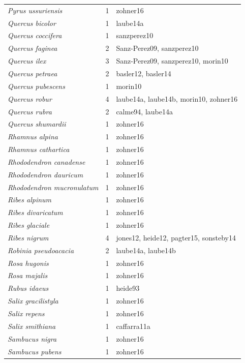 \documentclass{article}
\begin{document}
\begin{footnotesize}
\begin{longtable}{p{}p{}p{}}
  \textit{Pyrus ussuriensis} &   1 & zohner16 \\ 
  \textit{Quercus bicolor} &   1 & laube14a \\ 
  \textit{Quercus coccifera} &   1 & sanzperez10 \\ 
  \textit{Quercus faginea} &   2 & Sanz-Perez09, sanzperez10 \\ 
  \textit{Quercus ilex} &   3 & Sanz-Perez09, sanzperez10, morin10 \\ 
  \textit{Quercus petraea} &   2 & basler12, basler14 \\ 
  \textit{Quercus pubescens} &   1 & morin10 \\ 
  \textit{Quercus robur} &   4 & laube14a, laube14b, morin10, zohner16 \\ 
  \textit{Quercus rubra} &   2 & calme94, laube14a \\ 
  \textit{Quercus shumardii} &   1 & zohner16 \\ 
  \textit{Rhamnus alpina} &   1 & zohner16 \\ 
  \textit{Rhamnus cathartica} &   1 & zohner16 \\ 
  \textit{Rhododendron canadense} &   1 & zohner16 \\ 
  \textit{Rhododendron dauricum} &   1 & zohner16 \\ 
  \textit{Rhododendron mucronulatum} &   1 & zohner16 \\ 
  \textit{Ribes alpinum} &   1 & zohner16 \\ 
  \textit{Ribes divaricatum} &   1 & zohner16 \\ 
  \textit{Ribes glaciale} &   1 & zohner16 \\ 
  \textit{Ribes nigrum} &   4 & jones12, heide12, pagter15, sonsteby14 \\ 
  \textit{Robinia pseudoacacia} &   2 & laube14a, laube14b \\ 
  \textit{Rosa hugonis} &   1 & zohner16 \\ 
  \textit{Rosa majalis} &   1 & zohner16 \\ 
  \textit{Rubus idaeus} &   1 & heide93 \\ 
  \textit{Salix gracilistyla} &   1 & zohner16 \\ 
  \textit{Salix repens} &   1 & zohner16 \\ 
  \textit{Salix smithiana} &   1 & caffarra11a \\ 
  \textit{Sambucus nigra} &   1 & zohner16 \\ 
  \textit{Sambucus pubens} &   1 & zohner16 \\ 

\end{longtable}
\end{footnotesize}
\end{document}
